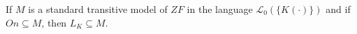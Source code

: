 If $M$ is a standard transitive model of $ZF$ in the language $\mathcal{L}_0(\{K(\cdot)\})$ and if $On \subseteq M$, then $L_K \subseteq M$.
